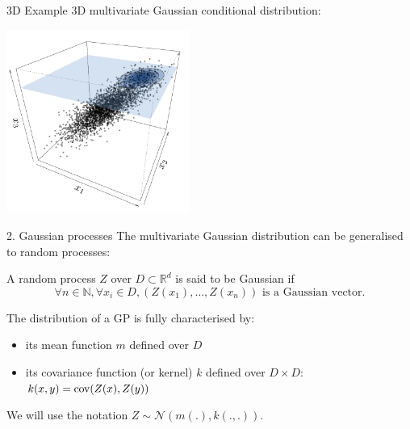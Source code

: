 \begin{frame}{}
\begin{exampleblock}{3D Example}
3D multivariate Gaussian conditional distribution:\\
\begin{center}
\includegraphics[height=6cm]{1_stat_models/figures/ch1_condpdf2}
\end{center}
\end{exampleblock}
\end{frame}



\begin{frame}{2. Gaussian processes}
The multivariate Gaussian distribution can be generalised to random processes:
\begin{definition}
A random process $Z$ over $D \subset \mathds{R}^d$ is said to be Gaussian if
\begin{equation*}
\forall n \in \mathds{N}, \forall x_i \in D, (Z(x_1),\dots,Z(x_n)) \text{  is a Gaussian vector}.
\end{equation*}
\end{definition}
The distribution of a GP is fully characterised by:
\begin{itemize}
	\item its mean function $m$ defined over $D$
	\item its covariance function (or kernel) $k$ defined over $D \times D$: $k(x,y) = \operatorname*{cov}(Z(x),Z(y))$
\end{itemize}
We will use the notation $Z \sim \mathcal{N}(m(.),k(.,.))$.\\
\end{frame}


